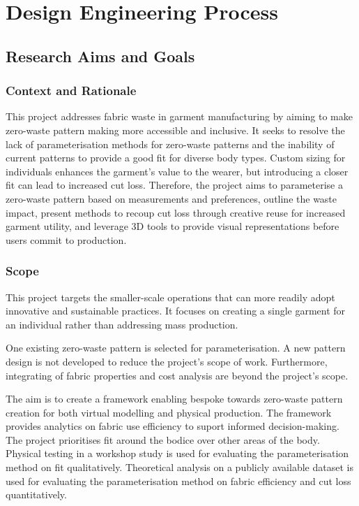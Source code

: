 \chapter{Design Engineering Process} 
\section{Research Aims and Goals}
\subsection{Context and Rationale}
This project addresses fabric waste in garment manufacturing by aiming to make zero-waste pattern making more accessible and inclusive. It seeks to resolve the lack of parameterisation methods for zero-waste patterns and the inability of current patterns to provide a good fit for diverse body types. Custom sizing for individuals enhances the garment's value to the wearer, but introducing a closer fit can lead to increased cut loss. Therefore, the project aims to parameterise a zero-waste pattern based on measurements and preferences, outline the waste impact, present methods to recoup cut loss through creative reuse for increased garment utility, and leverage 3D tools to provide visual representations before users commit to production.

\subsection{Scope}
This project targets the smaller-scale operations that can more readily adopt innovative and sustainable practices. It focuses on creating a single garment for an individual rather than addressing mass production.

One existing zero-waste pattern is selected for parameterisation. A new pattern design is not developed to reduce the project's scope of work. Furthermore, integrating of fabric properties and cost analysis are beyond the project's scope.

The aim is to create a framework enabling bespoke towards zero-waste pattern creation for both virtual modelling and physical production. The framework provides analytics on fabric use efficiency to suport informed decision-making. The project prioritises fit around the bodice over other areas of the body. Physical testing in a workshop study is used for evaluating the parameterisation method on fit qualitatively. Theoretical analysis on a publicly available dataset is used for evaluating the parameterisation method on fabric efficiency and cut loss quantitatively.

